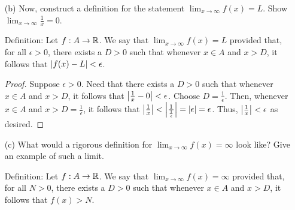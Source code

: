 \documentclass[12pt,letterpaper]{article}
\begin{document}
\begin{itemize}[leftmargin=!,labelindent=5pt]
\begin{itemize}
                    Definition: Let $f : A \to \bbR$. We say that $\lim_{x \to c} f(x) = \infty$ provided that, for all $N > 0$, there exists a $\delta > 0$ such that whenever $x \in A$ and $0 < \abs{x-c} < \delta$, it follows that $f(x) > N$. 
                    
                    \begin{proof}
                        Suppose $N > 0$.
                        Need that there exists a $\delta > 0$ such that whenever $x \in A$ and $0 < \abs{x-c} = \abs{x} < \delta$, it follows that $f(x) > N$.
                        Choose $\delta = \frac{1}{\sqrt(N)}$.
                        Then, whenever $x \in A$ and $0 < \abs{x} < \delta = \frac{1}{\sqrt(N)}$, it follows that $x^2 <  \frac{1}{N}$.
                        Thus, $\frac{1}{x^2} = f(x) > N$ as desired.
                    \end{proof}
                \item [(b)] Now, construct a definition for the statement $\lim_{x \to \infty} f(x) = L$. Show $\lim_{x \to \infty} \frac{1}{x} = 0$.
                    
                    Definition: Let $f : A \to \bbR$. We say that $\lim_{x \to \infty} f(x) = L$ provided that, for all $\epsilon > 0$, there exists a $D > 0$ such that whenever $x \in A$ and $x > D$, it follows that $\abs{f(x) - L} < \epsilon$. 

                    \begin{proof}
                        Suppose $\epsilon > 0$.
                        Need that there exists a $D > 0$ such that whenever $x \in A$ and $x > D$, it follows that $\abs{\frac{1}{x} - 0} < \epsilon$. 
                        Choose $D = \frac{1}{\epsilon}$.
                        Then, whenever $x \in A$ and $x > D = \frac{1}{\epsilon}$, it follows that $\abs{\frac{1}{x}} < \abs{\frac{1}{\frac{1}{\epsilon}}} = \abs{\epsilon} = \epsilon$.
                        Thus, $\abs{\frac{1}{x}} < \epsilon$ as desired.
                    \end{proof}
                \item [(c)] What would a rigorous definition for $\lim_{x \to \infty} f(x) = \infty$ look like? Give an example of such a limit.
                
                    Definition: Let $f : A \to \bbR$. We say that $\lim_{x \to \infty} f(x) = \infty$ provided that, for all $N > 0$, there exists a $D > 0$ such that whenever $x \in A$ and $x > D$, it follows that $f(x) > N$.


\end{itemize}
\end{itemize}
\end{document}
